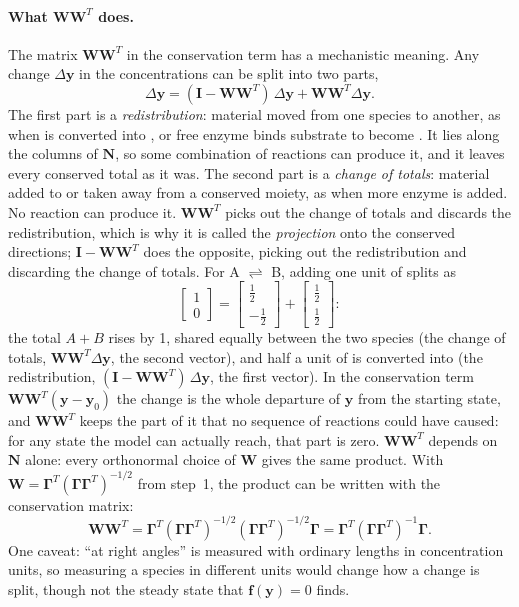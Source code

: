 \documentclass[11pt,a4paper,openany]{report}
\begin{document}
{{\paragraph{What $\mathbf{W}\mathbf{W}^T$ does.} The matrix
$\mathbf{W}\mathbf{W}^T$ in the conservation term has a mechanistic meaning.
Any change $\Delta\mathbf{y}$ in the concentrations can be split into two
parts,
\[
  \Delta\mathbf{y} = (\mathbf{I} - \mathbf{W}\mathbf{W}^T)\,\Delta\mathbf{y}
    + \mathbf{W}\mathbf{W}^T \Delta\mathbf{y} .
\]
The first part is a \emph{redistribution}: material moved from one species
to another, as when  is converted into , or free enzyme
 binds substrate to become . It lies along the columns of
$\mathbf{N}$, so some combination of reactions can produce it, and it leaves
every conserved total as it was. The second part is a \emph{change of
totals}: material added to or taken away from a conserved moiety, as when
more enzyme is added. No reaction can produce it. $\mathbf{W}\mathbf{W}^T$
picks out the change of totals and discards the redistribution, which is
why it is called the \emph{projection} onto the conserved directions;
$\mathbf{I} - \mathbf{W}\mathbf{W}^T$ does the opposite, picking out the
redistribution and discarding the change of totals. For
A $\rightleftharpoons$ B, adding one unit of  splits as
\[
  \begin{bmatrix} 1 \\ 0 \end{bmatrix}
  = \begin{bmatrix} \tfrac12 \\[2pt] -\tfrac12 \end{bmatrix}
  + \begin{bmatrix} \tfrac12 \\[2pt] \tfrac12 \end{bmatrix} :
\]
the total $A + B$ rises by 1, shared equally between the two species (the
change of totals, $\mathbf{W}\mathbf{W}^T \Delta\mathbf{y}$, the second
vector), and half a unit of  is converted into  (the
redistribution, $(\mathbf{I} - \mathbf{W}\mathbf{W}^T)\,\Delta\mathbf{y}$,
the first vector). In the conservation
term $\mathbf{W}\mathbf{W}^T(\mathbf{y} - \mathbf{y}_0)$ the change is the
whole departure of $\mathbf{y}$ from the starting state, and
$\mathbf{W}\mathbf{W}^T$ keeps the part of it that no sequence of reactions
could have caused: for any state the model can actually reach, that part is
zero. $\mathbf{W}\mathbf{W}^T$ depends on $\mathbf{N}$ alone: every
orthonormal choice of $\mathbf{W}$ gives the same product. With
$\mathbf{W} = \mathbf{\Gamma}^T (\mathbf{\Gamma}\mathbf{\Gamma}^T)^{-1/2}$
from step~1, the product can be written with the conservation matrix:
\[
  \mathbf{W}\mathbf{W}^T
  = \mathbf{\Gamma}^T (\mathbf{\Gamma}\mathbf{\Gamma}^T)^{-1/2}
    (\mathbf{\Gamma}\mathbf{\Gamma}^T)^{-1/2} \mathbf{\Gamma}
  = \mathbf{\Gamma}^T (\mathbf{\Gamma}\mathbf{\Gamma}^T)^{-1} \mathbf{\Gamma} .
\]
One caveat: ``at right angles'' is measured
with ordinary lengths in concentration units, so measuring a species in
different units would change how a change is split, though not the steady
state that $\mathbf{f}(\mathbf{y}) = 0$ finds.

}}
\end{document}
